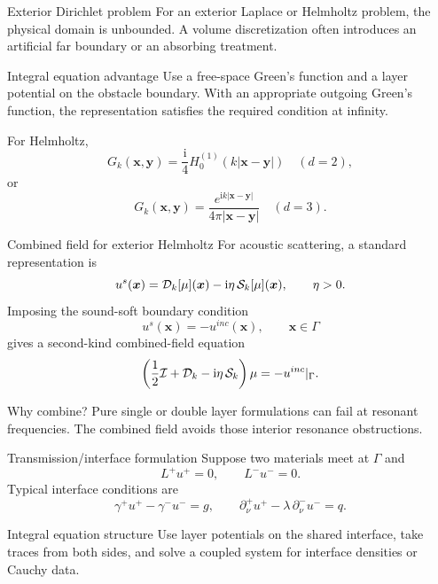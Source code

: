 \documentclass[aspectratio=169,11pt]{beamer}
\newcommand{\ii}{\mathrm i}
\newcommand{\x}{\bm{x}}
\newcommand{\y}{\bm{y}}
\begin{document}
\begin{frame}{Exterior Dirichlet problem}
\small
For an exterior Laplace or Helmholtz problem, the physical domain is unbounded.
A volume discretization often introduces an artificial far boundary or an
absorbing treatment.

\begin{block}{Integral equation advantage}
Use a free-space Green's function and a layer potential on the obstacle
boundary.  With an appropriate outgoing Green's function, the representation
satisfies the required condition at infinity.
\end{block}

For Helmholtz,
\[
  G_k(\x,\y)=\frac{\ii}{4}H_0^{(1)}(k|\x-\y|)
  \quad(d=2),
\]
or
\[
  G_k(\x,\y)=\frac{e^{\ii k|\x-\y|}}{4\pi|\x-\y|}
  \quad(d=3).
\]
\end{frame}

\begin{frame}{Combined field for exterior Helmholtz}
\small
For acoustic scattering, a standard representation is
\[
  u^s(\x)=\Dop_k[\mu](\x)-\ii\eta\,\Sop_k[\mu](\x),
  \qquad \eta>0.
\]
Imposing the sound-soft boundary condition
\[
  u^s(\x)=-u^{inc}(\x),\qquad \x\in\Gamma
\]
gives a second-kind combined-field equation
\[
  \left(\frac12\Iop+\Dop_k-\ii\eta\,\Sop_k\right)\mu
  =
  -u^{inc}|_\Gamma.
\]

\begin{block}{Why combine?}
Pure single or double layer formulations can fail at resonant frequencies.
The combined field avoids those interior resonance obstructions.
\end{block}
\end{frame}

\begin{frame}{Transmission/interface formulation}
\small
Suppose two materials meet at $\Gamma$ and
\[
L^+u^+=0,\qquad L^-u^-=0.
\]
Typical interface conditions are
\[
\gamma^+u^+-\gamma^-u^- = g,
\qquad
\partial_{\nu}^+u^+-\lambda\,\partial_{\nu}^-u^- = q.
\]

\begin{block}{Integral equation structure}
Use layer potentials on the shared interface, take traces from both sides,
and solve a coupled system for interface densities or Cauchy data.
\end{block}

\end{frame}
\end{document}

